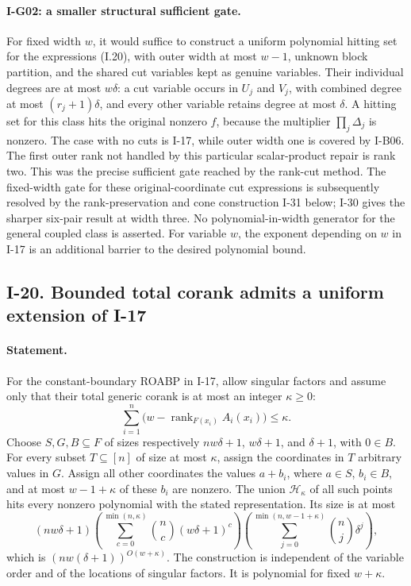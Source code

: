 \paragraph{I-G02: a smaller structural sufficient gate.}
\label{I-G02}
For fixed width $w$, it would suffice to construct a uniform polynomial
hitting set for the expressions (I.20), with outer width at most
$w-1$, unknown block partition, and the shared cut variables kept
as genuine variables.  Their individual degrees are at most
$w\delta$: a cut variable occurs in $U_j$ and $V_j$, with combined
degree at most $(r_j+1)\delta$, and every other variable retains
degree at most $\delta$.  A hitting set for this class hits the
original nonzero $f$, because the multiplier $\prod_j\Delta_j$
is nonzero.  The case with no cuts is I-17, while outer width one
is covered by I-B06.  The first outer rank not handled by this
particular scalar-product repair is rank two.  This was the precise
sufficient gate reached by the rank-cut method.  The fixed-width gate for these original-coordinate cut expressions is
subsequently resolved by the rank-preservation and cone construction
I-31 below; I-30 gives the sharper six-pair result at width three.
No polynomial-in-width generator for the general coupled class is asserted.  For variable
$w$, the exponent depending on $w$ in I-17 is an additional barrier
to the desired polynomial bound.

\subsection{I-20. Bounded total corank admits a uniform extension of I-17}
\label{I-20}

\paragraph{Statement.}
For the constant-boundary ROABP in I-17, allow singular factors and
assume only that their total generic corank is at most an integer
$\kappa\ge0$:
\[
 \sum_{i=1}^n\bigl(w-\operatorname{rank}_{F(x_i)}A_i(x_i)\bigr)
 \le\kappa.
\]
Choose $S,G,B\subseteq F$ of sizes respectively
$nw\delta+1$, $w\delta+1$, and $\delta+1$, with $0\in B$.
For every subset $T\subseteq[n]$ of size at most $\kappa$, assign
the coordinates in $T$ arbitrary values in $G$.  Assign all other
coordinates the values $a+b_i$, where $a\in S$, $b_i\in B$, and
at most $w-1+\kappa$ of these $b_i$ are nonzero.  The union
$\mathcal H_\kappa$ of all such points hits every nonzero polynomial
with the stated representation.  Its size is at most
\[
 (nw\delta+1)
 \left(\sum_{c=0}^{\min(n,\kappa)}\binom nc(w\delta+1)^c\right)
 \left(\sum_{j=0}^{\min(n,w-1+\kappa)}\binom nj\delta^j\right),
\tag{I.21}\label{eq:I-corank-hit}
\]
which is $(nw(\delta+1))^{O(w+\kappa)}$.
The construction is independent of the variable order and of the
locations of singular factors.  It is polynomial for fixed
$w+\kappa$.

